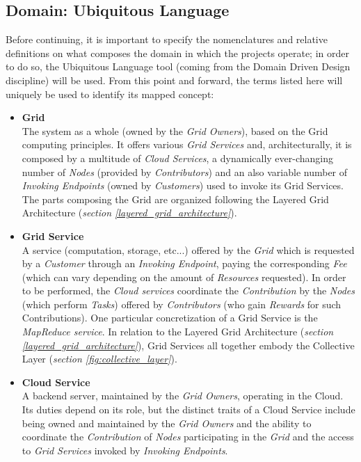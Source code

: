 \subsection{Domain: Ubiquitous Language}
Before continuing, it is important to specify the nomenclatures and relative definitions on what composes the domain in which the projects operate; in order to do so, the Ubiquitous Language tool (coming from the Domain Driven Design discipline) will be used. From this point and forward, the terms listed here will uniquely be used to identify its mapped concept:
\begin{itemize}
    \item \textbf{Grid}\label{grid}\\
    The system as a whole (owned by the \textit{Grid Owners}), based on the Grid computing principles. It offers various \textit{Grid Services} and, architecturally, it is composed by a multitude of \textit{Cloud Services}, a dynamically ever-changing number of \textit{Nodes} (provided by \textit{Contributors}) and an also variable number of \textit{Invoking Endpoints} (owned by \textit{Customers}) used to invoke its Grid Services. The parts composing the Grid are organized following the Layered Grid Architecture (\textit{section \ref{layered_grid_architecture}}).
    \item \textbf{Grid Service}\label{grid_service}\\
    A service (computation, storage, etc...) offered by the \textit{Grid} which is requested by a \textit{Customer} through an \textit{Invoking Endpoint}, paying the corresponding \textit{Fee} (which can vary depending on the amount of \textit{Resources} requested). In order to be performed, the \textit{Cloud services} coordinate the \textit{Contribution} by the \textit{Nodes} (which perform \textit{Tasks}) offered by \textit{Contributors} (who gain \textit{Rewards} for such Contributions). One particular concretization of a Grid Service is the \textit{MapReduce service}. In relation to the Layered Grid Architecture (\textit{section \ref{layered_grid_architecture}}), Grid Services all together embody the Collective Layer (\textit{section \ref{fig:collective_layer}}).
    \item \textbf{Cloud Service}\label{cloud_service}\\
    A backend server, maintained by the \textit{Grid Owners}, operating in the Cloud. Its duties depend on its role, but the distinct traits of a Cloud Service include being owned and maintained by the \textit{Grid Owners} and the ability to coordinate the \textit{Contribution} of \textit{Nodes} participating in the \textit{Grid} and the access to \textit{Grid Services} invoked by \textit{Invoking Endpoints}. 

\end{itemize}
